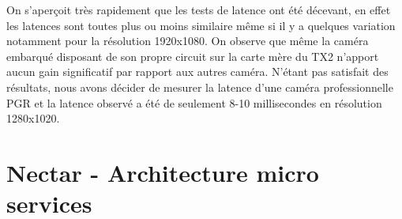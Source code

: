 \begin{table}[H]
\centering
\caption{Latence de plusieurs caméra mesuré en Glass to glass - NVIDIA Jetson TX2}
\label{fig:latency:camera}
\end{table}

On s'aperçoit très rapidement que les tests de latence ont été décevant, en effet les latences sont toutes plus ou moins similaire même si il y a quelques variation notamment pour la résolution 1920x1080. On observe que même la caméra embarqué disposant de son propre circuit sur la carte mère du TX2 n'apport aucun gain significatif par rapport aux autres caméra.
N'étant pas satisfait des résultats, nous avons décider de mesurer la latence d'une caméra professionnelle PGR et la latence observé a été de seulement 8-10 millisecondes en résolution 1280x1020.%

\section{Nectar - Architecture micro services}
